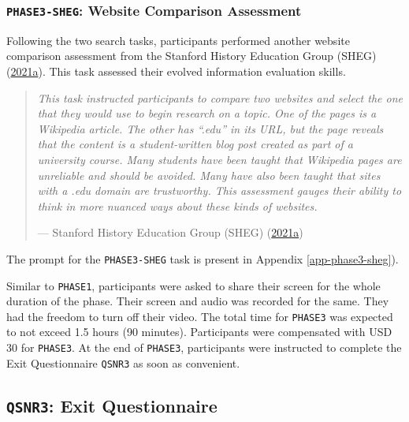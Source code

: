 \documentclass[letterpaper, nobind]{templates/ociamthesis}
\begin{document}
\hypertarget{phase3-sheg-website-comparison-assessment}{%
\subsubsection{\texorpdfstring{\texttt{PHASE3-SHEG}: Website Comparison Assessment}{PHASE3-SHEG: Website Comparison Assessment}}\label{phase3-sheg-website-comparison-assessment}}

Following the two search tasks, participants performed another website comparison assessment from the Stanford History Education Group (SHEG) (\protect\hyperlink{ref-sheg2021webpage-comparison}{2021a}). This task assessed their evolved information evaluation skills.

\begin{quote}
\emph{This task instructed participants to compare two websites and select the one that they would use to begin research on a topic. One of the pages is a Wikipedia article. The other has ``.edu'' in its URL, but the page reveals that the content is a student-written blog post created as part of a university course. Many students have been taught that Wikipedia pages are unreliable and should be avoided. Many have also been taught that sites with a .edu domain are trustworthy. This assessment gauges their ability to think in more nuanced ways about these kinds of websites.}

\hfill --- Stanford History Education Group (SHEG) (\protect\hyperlink{ref-sheg2021webpage-comparison}{2021a})
\end{quote}

The prompt for the \texttt{PHASE3-SHEG} task is present in Appendix \ref{app-phase3-sheg}).

Similar to \texttt{PHASE1}, participants were asked to share their screen for the whole duration of the phase.
Their screen and audio was recorded for the same. They had the freedom to turn off their video. The total time for \texttt{PHASE3} was expected to not exceed 1.5 hours (90 minutes).
Participants were compensated with USD 30 for \texttt{PHASE3}.
At the end of \texttt{PHASE3}, participants were instructed to complete the Exit Questionnaire \texttt{QSNR3} as soon as convenient.

\hypertarget{sec-method-qsnr3}{%
\subsection{\texorpdfstring{\texttt{QSNR3}: Exit Questionnaire}{QSNR3: Exit Questionnaire}}\label{sec-method-qsnr3}}
\end{document}
